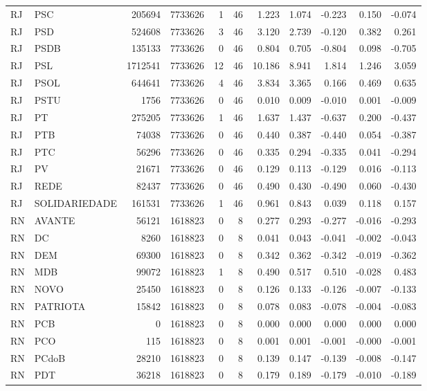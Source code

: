 \begin{landscape}
\begin{longtable}{llrrrrrrrrr}
RJ & PSC & 205694 & 7733626 & 1 & 46 & 1.223 & 1.074 & -0.223 & 0.150 & -0.074 \\
RJ & PSD & 524608 & 7733626 & 3 & 46 & 3.120 & 2.739 & -0.120 & 0.382 & 0.261 \\
RJ & PSDB & 135133 & 7733626 & 0 & 46 & 0.804 & 0.705 & -0.804 & 0.098 & -0.705 \\
RJ & PSL & 1712541 & 7733626 & 12 & 46 & 10.186 & 8.941 & 1.814 & 1.246 & 3.059 \\
RJ & PSOL & 644641 & 7733626 & 4 & 46 & 3.834 & 3.365 & 0.166 & 0.469 & 0.635 \\
RJ & PSTU & 1756 & 7733626 & 0 & 46 & 0.010 & 0.009 & -0.010 & 0.001 & -0.009 \\
RJ & PT & 275205 & 7733626 & 1 & 46 & 1.637 & 1.437 & -0.637 & 0.200 & -0.437 \\
RJ & PTB & 74038 & 7733626 & 0 & 46 & 0.440 & 0.387 & -0.440 & 0.054 & -0.387 \\
RJ & PTC & 56296 & 7733626 & 0 & 46 & 0.335 & 0.294 & -0.335 & 0.041 & -0.294 \\
RJ & PV & 21671 & 7733626 & 0 & 46 & 0.129 & 0.113 & -0.129 & 0.016 & -0.113 \\
RJ & REDE & 82437 & 7733626 & 0 & 46 & 0.490 & 0.430 & -0.490 & 0.060 & -0.430 \\
RJ & SOLIDARIEDADE & 161531 & 7733626 & 1 & 46 & 0.961 & 0.843 & 0.039 & 0.118 & 0.157 \\
RN & AVANTE & 56121 & 1618823 & 0 & 8 & 0.277 & 0.293 & -0.277 & -0.016 & -0.293 \\
RN & DC & 8260 & 1618823 & 0 & 8 & 0.041 & 0.043 & -0.041 & -0.002 & -0.043 \\
RN & DEM & 69300 & 1618823 & 0 & 8 & 0.342 & 0.362 & -0.342 & -0.019 & -0.362 \\
RN & MDB & 99072 & 1618823 & 1 & 8 & 0.490 & 0.517 & 0.510 & -0.028 & 0.483 \\
RN & NOVO & 25450 & 1618823 & 0 & 8 & 0.126 & 0.133 & -0.126 & -0.007 & -0.133 \\
RN & PATRIOTA & 15842 & 1618823 & 0 & 8 & 0.078 & 0.083 & -0.078 & -0.004 & -0.083 \\
RN & PCB & 0 & 1618823 & 0 & 8 & 0.000 & 0.000 & 0.000 & 0.000 & 0.000 \\
RN & PCO & 115 & 1618823 & 0 & 8 & 0.001 & 0.001 & -0.001 & -0.000 & -0.001 \\
RN & PCdoB & 28210 & 1618823 & 0 & 8 & 0.139 & 0.147 & -0.139 & -0.008 & -0.147 \\
RN & PDT & 36218 & 1618823 & 0 & 8 & 0.179 & 0.189 & -0.179 & -0.010 & -0.189 \\

\end{longtable}
\end{landscape}
